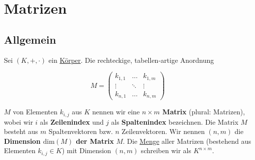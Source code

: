 \documentclass[../../main.tex]{subfiles}
\begin{document}
	
	\chapter{Matrizen}
	
	\section{Allgemein}
	
	\begin{definition}
		\label{def:Matrix}
		\label{def:DimensionMatrix}
		\label{def:Spaltenindex}
		\label{def:Zeilenindex}
		Sei $(K,+,\cdot)$ ein \hyperref[def:Körper]{Körper}. Die rechteckige, tabellen-artige Anordnung 
		
		$$M = \begin{pmatrix}
			k_{1,1} & \dots & k_{1,m} \\
			\vdots  & \ddots & \vdots \\
			k_{n,1} & \dots & k_{n,m}
		\end{pmatrix}$$
		
		$M$ von Elementen $k_{i,j}$ aus $K$ nennen wir eine \textbf{$n\times m$ Matrix} (plural: Matrizen), wobei wir $i$ als \textbf{Zeilenindex} und $j$ als \textbf{Spaltenindex} bezeichnen. Die Matrix $M$ besteht aus $m$ Spaltenvektoren bzw. $n$ Zeilenvektoren. Wir nennen $(n,m)$ die \textbf{Dimension $\textrm{dim}(M)$ der Matrix} $M$. Die \hyperref[def:Menge]{Menge} aller Matrizen (bestehend aus Elementen $k_{i,j} \in K$) mit Dimension $(n,m)$ schreiben wir als $K^{n \times m}$. 
	\end{definition}
\end{document}
